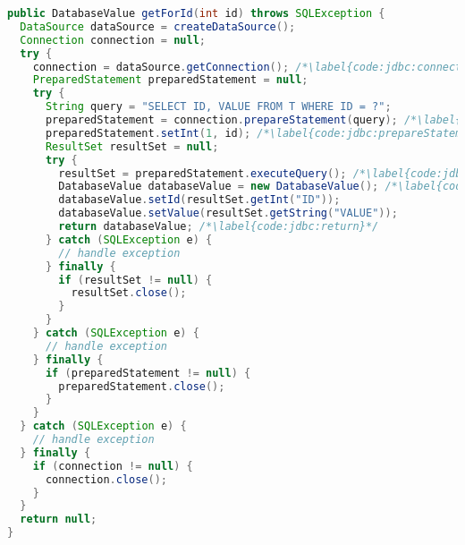
\begin{lstlisting}[language=Java, caption={Example of loading data using JDBC API}, label={code:jdbc}]
public DatabaseValue getForId(int id) throws SQLException {
  DataSource dataSource = createDataSource();
  Connection connection = null;
  try {
    connection = dataSource.getConnection(); /*\label{code:jdbc:connection}*/
    PreparedStatement preparedStatement = null;
    try {
      String query = "SELECT ID, VALUE FROM T WHERE ID = ?";
      preparedStatement = connection.prepareStatement(query); /*\label{code:jdbc:prepareStatement:begin}*/
      preparedStatement.setInt(1, id); /*\label{code:jdbc:prepareStatement:end}*/
      ResultSet resultSet = null;
      try {
        resultSet = preparedStatement.executeQuery(); /*\label{code:jdbc:executeQuery}*/
        DatabaseValue databaseValue = new DatabaseValue(); /*\label{code:jdbc:mapping}*/
        databaseValue.setId(resultSet.getInt("ID"));
        databaseValue.setValue(resultSet.getString("VALUE"));
        return databaseValue; /*\label{code:jdbc:return}*/
      } catch (SQLException e) {
        // handle exception
      } finally {
        if (resultSet != null) {
          resultSet.close();
        }
      }
    } catch (SQLException e) {
      // handle exception
    } finally {
      if (preparedStatement != null) {
        preparedStatement.close();
      }
    }
  } catch (SQLException e) {
    // handle exception
  } finally {
    if (connection != null) {
      connection.close();
    }
  }
  return null;
}
\end{lstlisting}
